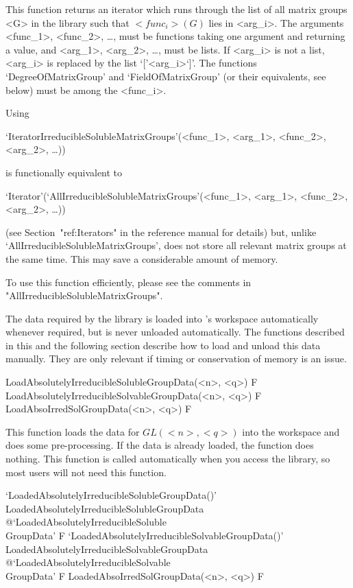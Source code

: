 This function returns an iterator which runs through the list of all matrix groups <G>
in the  {\IRREDSOL} library such that
$<func_i>(G)$ lies in <arg_i>. The arguments <func_1>, <func_2>, \dots,
must be {\GAP} functions taking one argument and returning a value, and <arg_1>, <arg_2>, \dots, 
must be lists. If <arg_i> is not a list, <arg_i> is replaced by the list `['<arg_i>`]'.
The functions `DegreeOfMatrixGroup' and `FieldOfMatrixGroup' (or their equivalents, see below) must be among the <func_i>. 


Using 

`IteratorIrreducibleSolubleMatrixGroups'(<func_1>, <arg_1>, <func_2>, <arg_2>, \dots)) 

is functionally equivalent to 

`Iterator'(`AllIrreducibleSolubleMatrixGroups'(<func_1>, <arg_1>, <func_2>, <arg_2>, \dots))

(see Section~"ref:Iterators" in the {\GAP} reference manual for details) but, unlike `AllIrreducibleSolubleMatrixGroups', does not store all 
relevant matrix groups at the same time. This may save a considerable amount of memory. 

To use this function efficiently, please see the comments in 
"AllIrreducibleSolubleMatrixGroups".


\null


The data required by the {\IRREDSOL} library is loaded into {\GAP}'s workspace automatically whenever required, but is never unloaded automatically. The functions described in this
and the following section describe how to load and unload this data manually. 
They are only relevant if timing or conservation of memory is an issue.

\>LoadAbsolutelyIrreducibleSolubleGroupData(<n>, <q>) F
\>LoadAbsolutelyIrreducibleSolvableGroupData(<n>, <q>) F
\>LoadAbsoIrredSolGroupData(<n>, <q>) F

This function loads the data for $GL(<n>, <q>)$ into the {\GAP} workspace and does 
some pre-processing. If the data is already loaded, the function does nothing. This 
function is called automatically when you access the
{\IRREDSOL} library, so most users  will not need this function.

\>`LoadedAbsolutelyIrreducibleSolubleGroupData()'%
{LoadedAbsolutelyIrreducibleSolubleGroupData}%
@{`LoadedAbsolutelyIrreducibleSoluble\\GroupData'} F
\>`LoadedAbsolutelyIrreducibleSolvableGroupData()'%
{LoadedAbsolutelyIrreducibleSolvableGroupData}%
@{`LoadedAbsolutelyIrreducibleSolvable\\GroupData'} F
\>LoadedAbsoIrredSolGroupData(<n>, <q>) F

